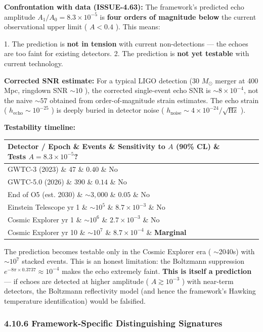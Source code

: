 \documentclass[11pt,a4paper]{article}
\theoremstyle{definition}\newtheorem{definition}{Definition}
\theoremstyle{remark}\newtheorem{remark}{Remark}
\begin{document}
\textbf{Confrontation with data (ISSUE-4.63):} The framework's predicted echo amplitude $A_1/A_0 = 8.3 \times 10^{-5}$ is \textbf{four orders of magnitude below} the current observational upper limit ( $A < 0.4$ ). This means:

1. The prediction is \textbf{not in tension} with current non-detections — the echoes are too faint for existing detectors.
2. The prediction is \textbf{not yet testable} with current technology.

\textbf{Corrected SNR estimate:} For a typical LIGO detection (30 $M_\odot$ merger at 400 Mpc, ringdown SNR $\sim 10$ ), the corrected single-event echo SNR is $\sim 8 \times 10^{-4}$, not the naive $\sim 57$ obtained from order-of-magnitude strain estimates. The echo strain ( $h_{\text{echo}} \sim 10^{-25}$ ) is deeply buried in detector noise ( $h_{\text{noise}} \sim 4 \times 10^{-24}/\sqrt{\text{Hz}}$ ).

\textbf{Testability timeline:}

\begin{longtable}{llll}
\hline
Detector / Epoch \& Events \& Sensitivity to $A$ (90\% CL) \& Tests $A = 8.3 \times 10^{-5}$? \\
\hline
GWTC-3 (2023) \& 47 \& $0.40$ \& No \\
GWTC-5.0 (2026) \& 390 \& $0.14$ \& No \\
End of O5 (est. 2030) \& $\sim 3{,}000$ \& $0.05$ \& No \\
Einstein Telescope yr 1 \& $\sim 10^5$ \& $8.7 \times 10^{-3}$ \& No \\
Cosmic Explorer yr 1 \& $\sim 10^6$ \& $2.7 \times 10^{-3}$ \& No \\
Cosmic Explorer yr 10 \& $\sim 10^7$ \& $8.7 \times 10^{-4}$ \& \textbf{Marginal} \\
\hline
\end{longtable}
The prediction becomes testable only in the Cosmic Explorer era ( $\sim$2040s) with $\sim 10^7$ stacked events. This is an honest limitation: the Boltzmann suppression $e^{-8\pi \times 0.3737} \approx 10^{-4}$ makes the echo extremely faint. \textbf{This is itself a prediction} — if echoes are detected at higher amplitude ( $A \gtrsim 10^{-3}$ ) with near-term detectors, the Boltzmann reflectivity model (and hence the framework's Hawking temperature identification) would be falsified.
\subsubsection{4.10.6 Framework-Specific Distinguishing Signatures}
\end{document}
